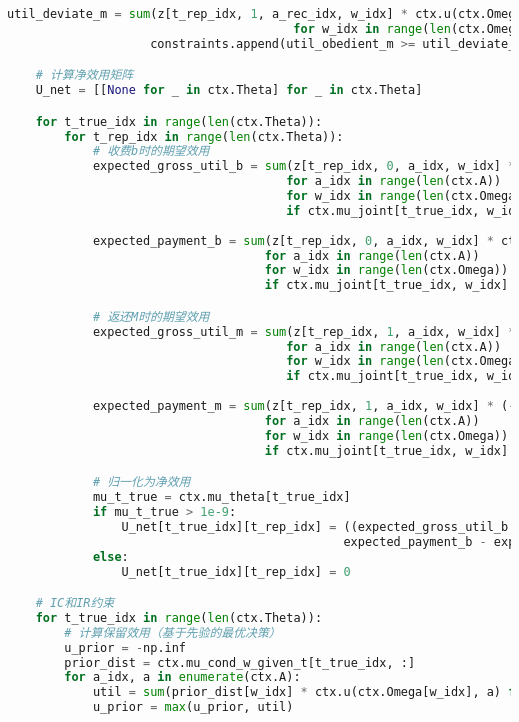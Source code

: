 \begin{lstlisting}[language=Python,style=pythonstyle]
                    util_deviate_m = sum(z[t_rep_idx, 1, a_rec_idx, w_idx] * ctx.u(ctx.Omega[w_idx], a_dev) 
                                        for w_idx in range(len(ctx.Omega)))
                    constraints.append(util_obedient_m >= util_deviate_m)

    # 计算净效用矩阵
    U_net = [[None for _ in ctx.Theta] for _ in ctx.Theta]

    for t_true_idx in range(len(ctx.Theta)):
        for t_rep_idx in range(len(ctx.Theta)):
            # 收费b时的期望效用
            expected_gross_util_b = sum(z[t_rep_idx, 0, a_idx, w_idx] * ctx.u(ctx.Omega[w_idx], ctx.A[a_idx])
                                       for a_idx in range(len(ctx.A))
                                       for w_idx in range(len(ctx.Omega))
                                       if ctx.mu_joint[t_true_idx, w_idx] > 0) 
            
            expected_payment_b = sum(z[t_rep_idx, 0, a_idx, w_idx] * ctx.b
                                    for a_idx in range(len(ctx.A))
                                    for w_idx in range(len(ctx.Omega))
                                    if ctx.mu_joint[t_true_idx, w_idx] > 0)

            # 返还M时的期望效用
            expected_gross_util_m = sum(z[t_rep_idx, 1, a_idx, w_idx] * ctx.u(ctx.Omega[w_idx], ctx.A[a_idx])
                                       for a_idx in range(len(ctx.A))
                                       for w_idx in range(len(ctx.Omega))
                                       if ctx.mu_joint[t_true_idx, w_idx] > 0)
            
            expected_payment_m = sum(z[t_rep_idx, 1, a_idx, w_idx] * (-ctx.M)
                                    for a_idx in range(len(ctx.A))
                                    for w_idx in range(len(ctx.Omega))
                                    if ctx.mu_joint[t_true_idx, w_idx] > 0)

            # 归一化为净效用
            mu_t_true = ctx.mu_theta[t_true_idx]
            if mu_t_true > 1e-9:
                U_net[t_true_idx][t_rep_idx] = ((expected_gross_util_b + expected_gross_util_m - 
                                               expected_payment_b - expected_payment_m) / mu_t_true)
            else:
                U_net[t_true_idx][t_rep_idx] = 0

    # IC和IR约束
    for t_true_idx in range(len(ctx.Theta)):
        # 计算保留效用（基于先验的最优决策）
        u_prior = -np.inf
        prior_dist = ctx.mu_cond_w_given_t[t_true_idx, :]
        for a_idx, a in enumerate(ctx.A):
            util = sum(prior_dist[w_idx] * ctx.u(ctx.Omega[w_idx], a) for w_idx in range(len(ctx.Omega)))
            u_prior = max(u_prior, util)
        

\end{lstlisting}
